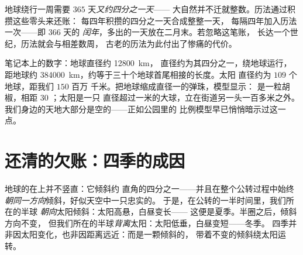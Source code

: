 \begin{example}[四分之一天与闰年]\label{ex:g6:sun-earth-moon:leap}
地球绕行一周需要 $365$ 天\emph{又约四分之一天}——
大自然并不迁就整数。历法通过积攒这些零头来还账：
每四年积攒的四分之一天合成整整一天，
每隔四年加入历法一次——即 $366$ 天的
\emph{闰年}，多出的一天放在二月末。若忽略这笔账，
长达一个世纪，历法就会与相差数周，
古老的历法为此付出了惨痛的代价。
\end{example}

\begin{example}[按比例的系统]\label{ex:g6:sun-earth-moon:scale}
笔记本上的数字：地球直径约 \qty{12800}{km}，
直径约为其四分之一，绕地球运行，距地球约
\qty{384000}{km}，约等于三十个地球首尾相接的长度。太阳
直径约为 $109$ 个地球，距我们 $150$ 百万
千米。把地球缩成直径一的弹珠，模型显示：
是一粒胡椒，相距 $30$ ；太阳是一只
直径超过一米的大球，立在街道另一头一百多米之外。
我们身边的天地大部分是空的——正如公园里的
比例模型早已悄悄暗示过这一点。
\end{example}

\section{还清的欠账：四季的成因}

\begin{proposition}[倾斜造成四季]\label{prop:g6:sun-earth-moon:tilt}
地球的在上并不竖直：它倾斜约
直角的四分之一——并且在整个公转过程中始终
\emph{朝同一方向}倾斜，好似天空中一只忠实的。
于是，在公转的一半时间里，我们所在的半球
\emph{朝向}太阳倾斜：太阳高悬，白昼变长——
这便是夏季。半圈之后，倾斜方向不变，
但我们所在的半球\emph{背离}太阳：太阳低垂，白昼变短——冬季。
四季并非因太阳变化，也非因距离远近：而是一颗倾斜的，
带着不变的倾斜绕太阳运转。
\end{proposition}

